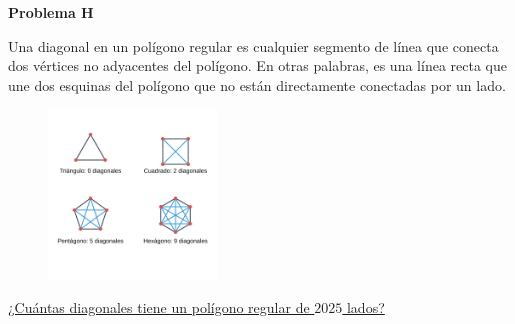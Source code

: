 \begin{center}
\Large \textbf{Problema H} \\
\end{center}

Una diagonal en un polígono regular es cualquier segmento de línea que conecta dos vértices no adyacentes del polígono.
En otras palabras, es una línea recta que une dos esquinas del polígono que no están directamente conectadas por un lado.

\begin{figure}[H]
    \centering
    \includegraphics[width=0.4\textwidth]{Imagenes/Stock/Diagonales de un poligono.png}
\end{figure}

\underline{¿Cuántas diagonales tiene un polígono regular de $2025$ lados?}

